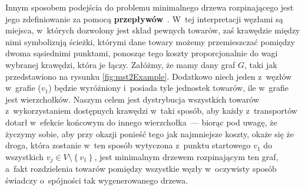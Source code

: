 Innym sposobem podejścia do problemu minimalnego drzewa rozpinającego jest jego zdefiniowanie za pomocą \textbf{przepływów}~\cite[$38$--$44$]{Magnanti1995503}.
W~tej interpretacji węzłami są miejsca, w~których dozwolony jest skład pewnych towarów, zaś krawędzie między nimi symbolizują ścieżki, którymi dane towary możemy przemieszczać pomiędzy dwoma sąsiednimi punktami, ponosząc tego koszty proporcjonalnie do wagi wybranej krawędzi, która je łączy.
Załóżmy, że mamy dany graf $G$, taki jak przedstawiono na rysunku \ref{fig:mst2Example}.
Dodatkowo niech jeden z~węzłów w~grafie ($v_{1}$) będzie wyróżniony i~posiada tyle jednostek towarów, ile w~grafie jest wierzchołków.
Naszym celem jest dystrybucja wszystkich towarów z~wykorzystaniem dostępnych krawędzi w~taki sposób, aby każdy z~transportów dotarł w~efekcie końcowym do innego wierzchołka~--- biorąc pod uwagę, że życzymy sobie, aby przy okazji ponieść tego jak najmniejsze koszty, okaże się że droga, która zostanie w~ten sposób wytyczona z~punktu startowego $v_{1}$ do wszystkich $v_{j} \in V \setminus \left\{ v_{1} \right\}$, jest minimalnym drzewem rozpinającym ten graf, a~fakt rozdzielenia towarów pomiędzy wszystkie węzły w~oczywisty sposób świadczy o~spójności tak wygenerowanego drzewa.

